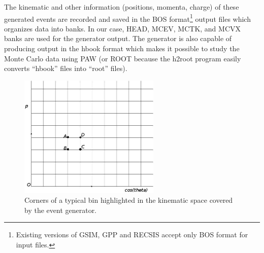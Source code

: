 The kinematic and other information (positions, momenta, charge) of these generated %
events %
are recorded and saved in the BOS format\footnote{Existing versions of GSIM, GPP and RECSIS accept only BOS format for input files.} output files which organizes data into banks. In our case, HEAD, MCEV, MCTK, and MCVX banks are used for the generator output. The generator is also capable of producing output in the hbook format which makes it possible to study the Monte Carlo data using PAW (or ROOT because the h2root program easily converts ``hbook'' files into ``root'' files).

\begin{figure}[htpb] %
\centering
  \leavevmode \includegraphics[width=0.6\textwidth]{figuresEG4/FigSim/kineGrid_steg.png} 
  \caption[A section of the kinematics grid]{Corners of a typical bin highlighted in the kinematic space covered by the event generator.}
  \label{CSgrid}  %
\end{figure}

